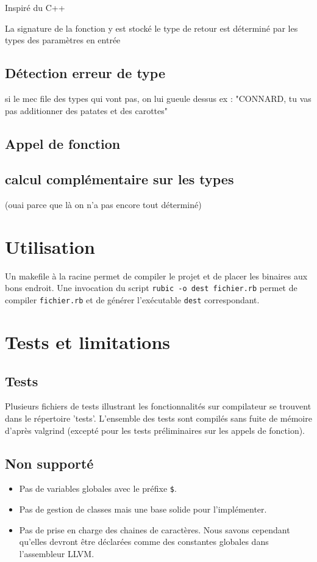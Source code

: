 \documentclass[12pt]{article}
\begin{document}
Inspiré du  C++

La signature de la fonction y est stocké
le type de retour est déterminé par les types des paramètres en entrée

\subsection{Détection erreur de type}

si le mec file des types qui vont pas, on lui gueule dessus
ex : "CONNARD, tu vas pas additionner des patates et des carottes"

\subsection{Appel de fonction}

\subsection{calcul complémentaire sur les types}
(ouai parce que là on n'a pas encore tout déterminé)


\section{Utilisation}

Un makefile à la racine permet de compiler le projet et de placer les binaires aux bons endroit. Une invocation du script \verb!rubic -o dest fichier.rb! permet de compiler \verb!fichier.rb! et de générer l'exécutable \verb!dest! correspondant.


\section{Tests et limitations}

\subsection{Tests}

Plusieurs fichiers de tests illustrant les fonctionnalités sur compilateur se trouvent dans le répertoire 'tests'. L'ensemble des tests sont compilés sans fuite de mémoire d'après valgrind (excepté pour les tests préliminaires sur les appels de fonction).

\subsection{Non supporté}
\begin{itemize}
	\item Pas de variables globales avec le préfixe \verb!$!.
	\item Pas de gestion de classes mais une base solide pour l'implémenter.
	\item Pas de prise en charge des chaines de caractères. Nous savons cependant qu'elles devront être déclarées comme des constantes globales dans l'assembleur LLVM.
\end{itemize}
\end{document}
